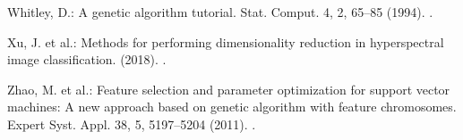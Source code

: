 \documentclass[runningheads]{llncs}
\begin{document}
\begin{thebibliography}{8}
Whitley, D.: A genetic algorithm tutorial. Stat. Comput. 4, 2, 65–85 (1994). .

Xu, J. et al.: Methods for performing dimensionality reduction in hyperspectral image classification. (2018). .

Zhao, M. et al.: Feature selection and parameter optimization for support vector machines: A new approach based on genetic algorithm with feature chromosomes. Expert Syst. Appl. 38, 5, 5197–5204 (2011). .

\end{thebibliography}
\end{document}
